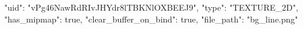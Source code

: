 {
    "uid": "vPg46NawRdRIvJHYdr8lTBKNlOXBEEJ9",
    "type": "TEXTURE_2D",
    "has_mipmap": true,
    "clear_buffer_on_bind": true,
    "file_path": "bg_line.png"
}